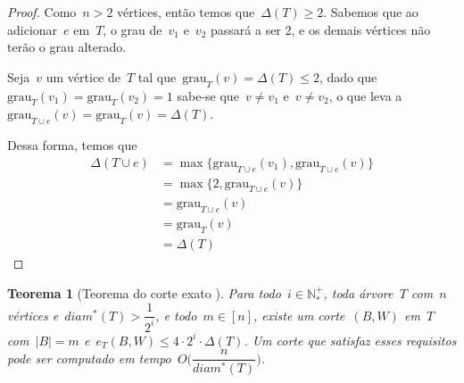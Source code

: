 \documentclass[a4paper,12pt]{article}
\newtheorem{teo}{Teorema}
\newcommand{\grau}{\mathrm{grau}}
\begin{document}
	
	\begin{proof}
		Como~$n>2$ vértices, então temos que~$\Delta(T)\ge 2$.
		Sabemos que ao adicionar~$e$ em~$T$, o grau de~$v_1$
		e~$v_2$ passará a ser 2, e os demais vértices não terão
		o grau alterado.
		
		Seja~$v$ um vértice de~$T$ tal 
		que~${\grau_T(v) = \Delta(T)\le 2}$,
		dado que~${\grau_T(v_1)=\grau_T(v_2)=1}$
		sabe-se que~${v\ne v_1}$ e~${v\ne v_2}$, o que leva 
		a~${\grau_{T\cup e}(v)=\grau_T(v)=\Delta(T)}$.

		
		Dessa forma, temos que
		\begin{align}
			\Delta(T\cup e) &= \max\{\grau_{T\cup e}(v_1), 
			\grau_{T\cup e}(v)\}\nonumber\\
         		&= \max\{2, \grau_{T\cup e}(v)\} \nonumber\\
				&= \grau_{T\cup e}(v) \nonumber\\
         		&= \grau_T(v) \nonumber\\
         		&= \Delta(T) \nonumber
		\end{align}		

	\end{proof}

	\bigskip
	\bigskip
	\bigskip

	\begin{teo}[Teorema do corte exato
	{\cite[Theorem 6]{Schmidt15}}]
	\label{teo:corteExato}
		Para todo~${i\in \mathbb{N^+_*}}$, toda árvore~$T$ com~$n$
		vértices e~${diam^*(T)>\dfrac{1}{2^i}}$, e todo~${m\in[n]}$,
		existe um corte~$(B,W)$ em~$T$ com~$|B|=m$ 
		e~$e_T(B,W)\le 4\cdot 2^i\cdot \Delta(T)$.
		Um corte que satisfaz esses requisitos pode ser computado
		em tempo~${O\Big(\dfrac{n}{diam^*(T)}\Big)}$.
	\end{teo}

	\medskip
	\medskip
\end{document}
